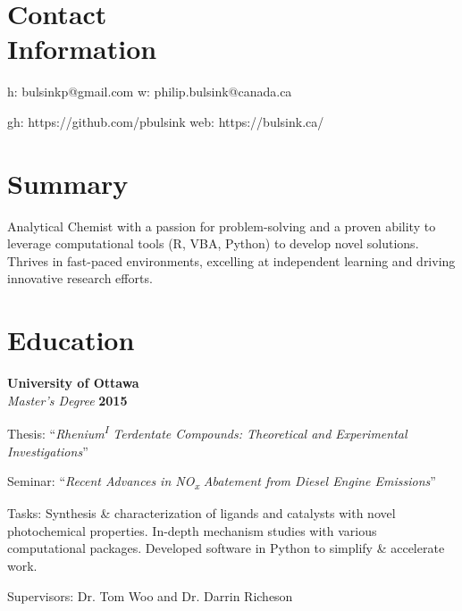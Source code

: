 \documentclass[margin,line]{resumecls}
\begin{document}
\thispagestyle{plain}
\begin{resume}

    \section{\mysidestyle Contact\\Information}

    h: bulsinkp@gmail.com \hfill w: philip.bulsink@canada.ca%
    \vspace{-4.5mm}

    gh: https://github.com/pbulsink \hfill web: https://bulsink.ca/%
    \\\vspace{-4.5mm}

    \section{\mysidestyle Summary}

    Analytical Chemist with a passion for problem-solving and a proven ability to leverage computational tools (R, VBA, Python) to develop novel solutions.
    Thrives in fast-paced environments, excelling at independent learning and driving innovative research efforts.


    \section{\mysidestyle Education}

    \textbf{University of Ottawa}\\\vspace{1mm}%
    \textsl{Master's Degree} \hfill \textbf{2015}\vspace{-3mm}\\\vspace{-1mm}%
    \begin{list2}
        \item Thesis: ``\textit{Rhenium\textsuperscript{I} Terdentate Compounds: Theoretical and Experimental Investigations}''
        \item Seminar: ``\textit{Recent Advances in NO\textsubscript{x} Abatement from Diesel Engine Emissions}''
        \item Tasks: Synthesis \& characterization of ligands and catalysts with novel photochemical properties.
        In-depth mechanism studies with various computational packages.
        Developed software in Python to simplify \& accelerate work.
        \item Supervisors: Dr. Tom Woo and Dr. Darrin Richeson
    \end{list2}


\end{resume}
\end{document}
